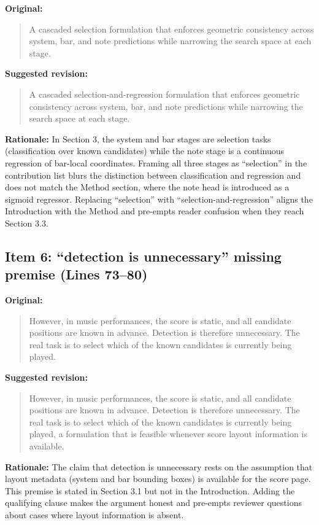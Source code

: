 \documentclass{article}
\begin{document}
\textbf{Original:}
\begin{quote}
A cascaded selection formulation that enforces geometric consistency across system, bar, and note predictions while narrowing the search space at each stage.
\end{quote}

\textbf{Suggested revision:}
\begin{quote}
A cascaded selection-and-regression formulation that enforces geometric consistency across system, bar, and note predictions while narrowing the search space at each stage.
\end{quote}

\textbf{Rationale:}
In Section 3, the system and bar stages are selection tasks (classification over known candidates) while the note stage is a continuous regression of bar-local coordinates. Framing all three stages as ``selection'' in the contribution list blurs the distinction between classification and regression and does not match the Method section, where the note head is introduced as a sigmoid regressor. Replacing ``selection'' with ``selection-and-regression'' aligns the Introduction with the Method and pre-empts reader confusion when they reach Section 3.3.

\subsection*{Item 6: ``detection is unnecessary'' missing premise (Lines 73--80)}

\textbf{Original:}
\begin{quote}
However, in music performances, the score is static, and all candidate positions are known in advance. Detection is therefore unnecessary. The real task is to select which of the known candidates is currently being played.
\end{quote}

\textbf{Suggested revision:}
\begin{quote}
However, in music performances, the score is static, and all candidate positions are known in advance. Detection is therefore unnecessary. The real task is to select which of the known candidates is currently being played, a formulation that is feasible whenever score layout information is available.
\end{quote}

\textbf{Rationale:}
The claim that detection is unnecessary rests on the assumption that layout metadata (system and bar bounding boxes) is available for the score page. This premise is stated in Section 3.1 but not in the Introduction. Adding the qualifying clause makes the argument honest and pre-empts reviewer questions about cases where layout information is absent.
\end{document}
